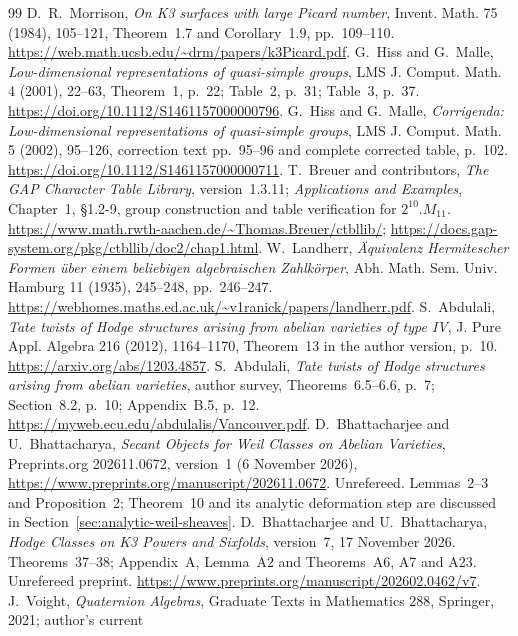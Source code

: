 \begin{thebibliography}{99}
 D.~R.~Morrison, \emph{On K3 surfaces with large Picard number}, Invent. Math. 75 (1984), 105--121, Theorem~1.7 and Corollary~1.9, pp.~109--110. \url{https://web.math.ucsb.edu/~drm/papers/k3Picard.pdf}.
 G.~Hiss and G.~Malle, \emph{Low-dimensional representations of quasi-simple groups}, LMS J. Comput. Math. 4 (2001), 22--63, Theorem~1, p.~22; Table~2, p.~31; Table~3, p.~37. \url{https://doi.org/10.1112/S1461157000000796}.
 G.~Hiss and G.~Malle, \emph{Corrigenda: Low-dimensional representations of quasi-simple groups}, LMS J. Comput. Math. 5 (2002), 95--126, correction text pp.~95--96 and complete corrected table, p.~102. \url{https://doi.org/10.1112/S1461157000000711}.
 T.~Breuer and contributors, \emph{The GAP Character Table Library}, version~1.3.11; \emph{Applications and Examples}, Chapter~1, \S1.2-9, group construction and table verification for $2^{10}.M_{11}$. \url{https://www.math.rwth-aachen.de/~Thomas.Breuer/ctbllib/}; \url{https://docs.gap-system.org/pkg/ctbllib/doc2/chap1.html}.
 W.~Landherr, \emph{\"Aquivalenz Hermitescher Formen \"uber einem beliebigen algebraischen Zahlk\"orper}, Abh. Math. Sem. Univ. Hamburg 11 (1935), 245--248, pp.~246--247. \url{https://webhomes.maths.ed.ac.uk/~v1ranick/papers/landherr.pdf}.
 S.~Abdulali, \emph{Tate twists of Hodge structures arising from abelian varieties of type IV}, J. Pure Appl. Algebra 216 (2012), 1164--1170, Theorem~13 in the author version, p.~10. \url{https://arxiv.org/abs/1203.4857}.
 S.~Abdulali, \emph{Tate twists of Hodge structures arising from abelian varieties}, author survey, Theorems~6.5--6.6, p.~7; Section~8.2, p.~10; Appendix~B.5, p.~12. \url{https://myweb.ecu.edu/abdulalis/Vancouver.pdf}.
 D.~Bhattacharjee and U.~Bhattacharya,
\emph{Secant Objects for Weil Classes on Abelian Varieties},
Preprints.org 202611.0672, version~1 (6 November 2026),
\url{https://www.preprints.org/manuscript/202611.0672}.
Unrefereed. Lemmas~2--3 and Proposition~2; Theorem~10 and its
analytic deformation step are discussed in Section~\ref{sec:analytic-weil-sheaves}.
 D.~Bhattacharjee and U.~Bhattacharya,
\emph{Hodge Classes on K3 Powers and Sixfolds}, version~7,
17 November 2026. Theorems~37--38; Appendix~A, Lemma~A2 and
Theorems~A6, A7 and A23.
Unrefereed preprint.
\url{https://www.preprints.org/manuscript/202602.0462/v7}.
 J.~Voight, \emph{Quaternion Algebras},
Graduate Texts in Mathematics 288, Springer, 2021; author's current

\end{thebibliography}

